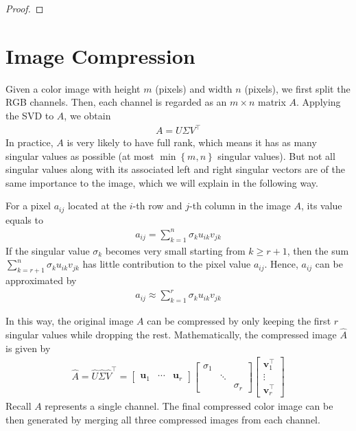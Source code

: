 \documentclass[color=blue, thmcnt=section, 12pt]{elegantbook}
\begin{document}
\begin{proof}
\end{proof}


\section{Image Compression}

\par Given a color image with height $m$ (pixels) and width $n$ (pixels), we first split the RGB channels. Then, each channel is regarded as an $m \times n$ matrix $A$. Applying the SVD to $A$, we obtain
\begin{align*}
    A = U \Sigma V^\top
\end{align*}
In practice, $A$ is very likely to have full rank, which means it has as many singular values as possible (at most $\min\left\{m, n\right\}$ singular values). But not all singular values along with its associated left and right singular vectors are of the same importance to the image, which we will explain in the following way.

\par For a pixel $a_{ij}$ located at the $i$-th row and $j$-th column in the image $A$, its value equals to 
\begin{align*}
    a_{ij} = \sum_{k=1}^n \sigma_k u_{ik} v_{jk}
\end{align*}
If the singular value $\sigma_k$ becomes very small starting from $k \geq r+1$, then the sum $\sum_{k=r+1}^n \sigma_k u_{ik} v_{jk}$ has little contribution to the pixel value $a_{ij}$. Hence, $a_{ij}$ can be approximated by 
\begin{align*}
    a_{ij} \approx \sum_{k=1}^r \sigma_k u_{ik} v_{jk}
\end{align*}

\par In this way, the original image $A$ can be compressed by only keeping the first $r$ singular values while dropping the rest. Mathematically, the compressed image $\hat{A}$ is given by
\begin{align*}
    \hat{A} = \hat{U} \hat{\Sigma} \hat{V}^\top
    = \begin{bmatrix}
        \mathbf{u}_1 & \cdots & \mathbf{u}_r
    \end{bmatrix} \begin{bmatrix}
        \sigma_1 & & \\ 
        & \ddots & \\ 
        & & \sigma_r
    \end{bmatrix} \begin{bmatrix}
        \mathbf{v}^\top_1 \\ \vdots \\ \mathbf{v}^\top_r
    \end{bmatrix}
\end{align*}
Recall $A$ represents a single channel. The final compressed color image can be then generated by merging all three compressed images from each channel.
\end{document}
